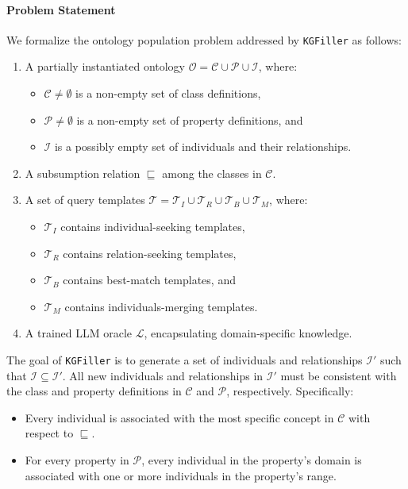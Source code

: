 \paragraph{Problem Statement}
We formalize the ontology population problem addressed by \texttt{KGFiller} as follows:
%
\begin{enumerate}
    \item A partially instantiated ontology \(\mathcal{O} = \mathcal{C} \cup \mathcal{P} \cup \mathcal{I}\), where:
    \begin{itemize}
        \item \(\mathcal{C} \neq \emptyset\) is a non-empty set of class definitions,
        \item \(\mathcal{P} \neq \emptyset\) is a non-empty set of property definitions, and
        \item \(\mathcal{I}\) is a possibly empty set of individuals and their relationships.
    \end{itemize}
    \item A subsumption relation \(\sqsubseteq\) among the classes in \(\mathcal{C}\).
    \item A set of query templates \(\mathcal{T} = \mathcal{T}_I \cup \mathcal{T}_R \cup \mathcal{T}_B \cup \mathcal{T}_M\), where:
    \begin{itemize}
        \item \(\mathcal{T}_I\) contains individual-seeking templates,
        \item \(\mathcal{T}_R\) contains relation-seeking templates,
        \item \(\mathcal{T}_B\) contains best-match templates, and
        \item \(\mathcal{T}_M\) contains individuals-merging templates.
    \end{itemize}
    \item A trained \gls{LLM} oracle \(\mathcal{L}\), encapsulating domain-specific knowledge.
\end{enumerate}

%

The goal of \texttt{KGFiller} is to generate a set of individuals and relationships \(\mathcal{I}'\) such that \(\mathcal{I} \subseteq \mathcal{I}'\).
%
All new individuals and relationships in \(\mathcal{I}'\) must be consistent with the class and property definitions in \(\mathcal{C}\) and \(\mathcal{P}\), respectively.
%
Specifically:
%
\begin{itemize}
    \item Every individual is associated with the most specific concept in \(\mathcal{C}\) with respect to \(\sqsubseteq\).
    \item For every property in \(\mathcal{P}\), every individual in the property’s domain is associated with one or more individuals in the property’s range.
\end{itemize}



